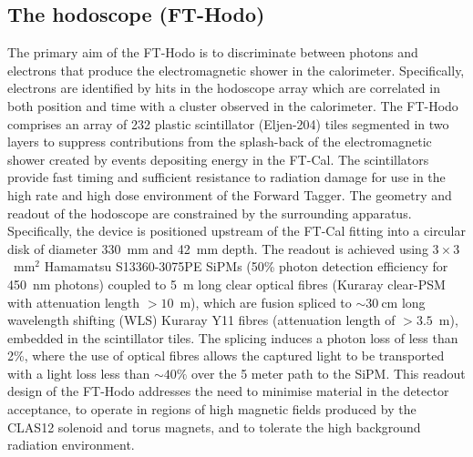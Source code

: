 \subsection{The hodoscope (FT-Hodo)}
The primary aim of the FT-Hodo is to discriminate between photons and electrons that produce the electromagnetic shower in the calorimeter. Specifically, electrons are identified by hits in the hodoscope array which are correlated in both position and time with a cluster observed in the calorimeter. The FT-Hodo comprises an array of 232 plastic scintillator (Eljen-204) tiles segmented in two layers to suppress contributions from the splash-back of the electromagnetic shower created by events depositing energy in the FT-Cal. The scintillators provide fast timing and sufficient resistance to radiation damage for use in the high rate and high dose environment of the Forward Tagger. The geometry and readout of the hodoscope are constrained by the surrounding apparatus. Specifically, the device is positioned upstream of the FT-Cal fitting into a circular disk of diameter 330~mm and 42~mm depth. The readout is achieved using $3\times 3$~mm$^2$ Hamamatsu S13360-3075PE SiPMs (50\% photon detection efficiency for 450~nm photons) coupled to 5~m long clear optical fibres (Kuraray clear-PSM with attenuation length $>10$~m), which are fusion spliced to $\sim 30~$cm long wavelength shifting (WLS) Kuraray Y11 fibres (attenuation length of $> 3.5$~m), embedded in the scintillator tiles. The splicing induces a photon loss of less than 2\%, where the use of optical fibres allows the captured light to be transported with a light loss less than $\sim40\%$ over the 5 meter path to the SiPM. This readout design of the FT-Hodo addresses the need to minimise material in the detector acceptance, to operate in regions of high magnetic fields produced by the CLAS12 solenoid and torus magnets, and to tolerate the high background radiation environment. 


